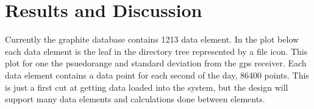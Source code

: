 \chapter{Results and Discussion}
\label{ch:results}
Currently the graphite database contains 1213 data element. In the plot below each data element is the leaf in the directory tree represented by a file icon. This plot for one the psuedorange and standard deviation from the \ac{gps} receiver. Each data element contains a data point for each second of the day, 86400 points.  This is just a first cut at getting data loaded into the system, but the design will support many data elements and calculations done between elements.
\\ \\
